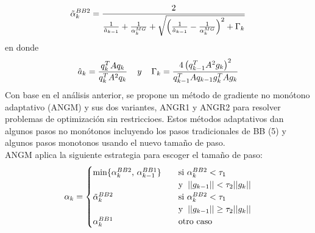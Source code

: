 \documentclass[conference]{IEEEtran}
\begin{document}
    \begin{align*}
        \Tilde{\alpha}_k^{BB2} = \frac{2}{ \frac{1}{\hat{a}_{k-1}} + \frac{1}{\alpha_k^{MG}} + \sqrt{\left(\frac{1}{\hat{a}_{k-1}} - \frac{1}{\alpha_k^{MG}} \right)^2 + \Gamma_k }   }
    \end{align*}
    en donde
    \begin{align}
        \hat{a}_k = \frac{q_k^T A q_k}{q_k^T A^2q_k} \hspace{0.4cm} y \hspace{0.4cm} \Gamma_k = \frac{4 \left(q_{k-1}^T A^2g_k \right)^2}{q_{k-1}^T A q_{k-1}g_k^T Ag_k}
    \end{align}
    Con base en el análisis anterior, se propone un método de gradiente no monótono adaptativo (ANGM) y sus dos variantes, ANGR1 y ANGR2 \cite{b1} para resolver problemas de optimización sin restriccioes. Estos métodos adaptativos dan algunos pasos no monótonos incluyendo los pasos tradicionales de BB (5) y algunos pasos monotonos usando el nuevo tamaño de paso. \\

    ANGM aplica la siguiente estrategia para escoger el tamaño de paso:
    \begin{align}
        \alpha_k =
         \begin{cases}
           \text{min\{$\alpha_k^{BB2}$, $\alpha_{k-1}^{BB1}$\}} &\quad\text{si } \alpha_k^{BB2}<\tau_1 \hspace{0.2cm}\\
           \text{} &\quad\text{y} \hspace{0.2cm} ||g_{k-1}|| < \tau_2||g_k||\\
            \text{$\Tilde{\alpha}_k^{BB2}$} &\quad\text{si  } \alpha_k^{BB2}<\tau_1 \hspace{0.2cm}\\
            \text{} &\quad\text{y} \hspace{0.2cm} ||g_{k-1}|| \geq \tau_2||g_k||\\
            \text{$\alpha_k^{BB1}$} &\quad\text{otro caso}
         \end{cases}
    \end{align}
\end{document}
